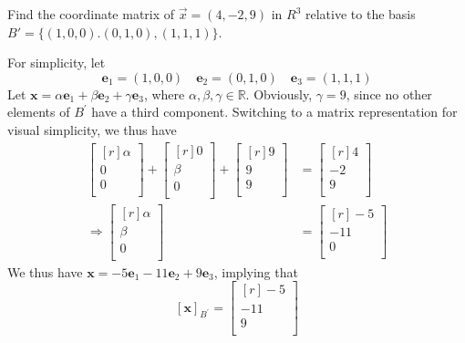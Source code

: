 \documentclass{article}
\theoremstyle{definition}
\newenvironment{solution}[1][]{\begin{replacementsoln}}{\end{replacementsoln}}
\begin{document}
\begin{exercise}
    Find the coordinate matrix of $\vec{x} =(4, -2, 9)$ in $R^3$ relative to the basis $B' = \{(1, 0, 0). (0, 1, 0), (1, 1, 1)\}$.
\end{exercise}

\begin{solution}
  For simplicity, let 
  \[
    \mathbf{e}_1 = (1,0,0)\quad \mathbf{e}_2=(0,1,0)\quad \mathbf{e}_3=(1,1,1)
  \]
  Let \(\mathbf{x}=\alpha \mathbf{e}_1 +\beta \mathbf{e}_2 +\gamma \mathbf{e}_3\), where \(\alpha ,\beta ,\gamma \in\mathbb{R}\). Obviously, \(\gamma =9\), since no other elements of \(B^{\prime} \) have a third component. Switching to a matrix representation for visual simplicity, we thus have 
  \begin{align*}
    \begin{bmatrix}[r]
       \alpha  \\
        0\\
        0\\
    \end{bmatrix}+\begin{bmatrix}[r]
       0 \\
       \beta  \\
        0\\
    \end{bmatrix}+\begin{bmatrix}[r]
       9 \\
       9 \\
       9 \\
    \end{bmatrix}&=\begin{bmatrix}[r]
       4 \\
       -2 \\
       9 \\
    \end{bmatrix}\\
    \Longrightarrow \begin{bmatrix}[r]
       \alpha  \\
        \beta \\
        0\\
    \end{bmatrix}&=\begin{bmatrix}[r]
       -5 \\
        -11\\
        0\\
    \end{bmatrix}
  \end{align*}
  We thus have \(\mathbf{x}= -5\mathbf{e}_1 -11\mathbf{e}_2 +9\mathbf{e}_3\), implying that 
  \[
    [\mathbf{x}]_{B^{\prime} }=\begin{bmatrix}[r]
       -5 \\
        -11\\
        9\\
    \end{bmatrix}
  \]
\end{solution}
\end{document}
